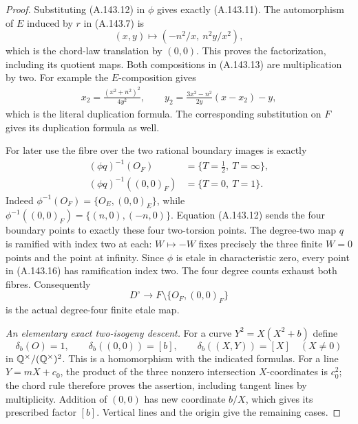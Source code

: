 \begin{proof}
Substituting (A.143.12) in \(\phi\) gives exactly (A.143.11).
The automorphism of \(E\) induced by \(r\) in (A.143.7) is
\[
                         (x,y)\longmapsto
                  (-n^2/x,\ n^2y/x^2),
\tag{A.143.14}
\]
which is the chord-law translation by \((0,0)\).
This proves the factorization, including its quotient maps.
Both compositions in (A.143.13) are multiplication by two.
For example the \(E\)-composition gives
\[
 \begin{gathered}
 x_2=\frac{(x^2+n^2)^2}{4y^2},\qquad
 y_2=\frac{3x^2-n^2}{2y}(x-x_2)-y ,
 \end{gathered}
\tag{A.143.15}
\]
which is the literal duplication formula.
The corresponding substitution on \(F\) gives its duplication
formula as well.

For later use the fibre over the two rational boundary images is
exactly
\[
 \begin{aligned}
 (\phi q)^{-1}(O_F)
      &=\{T=\tfrac12,\ T=\infty\},\\
 (\phi q)^{-1}((0,0)_F)
      &=\{T=0,\ T=1\}.
 \end{aligned}
\tag{A.143.16}
\]
Indeed \(\phi^{-1}(O_F)=\{O_E,(0,0)_E\}\), while
\(\phi^{-1}((0,0)_F)=\{(n,0),(-n,0)\}\).
Equation (A.143.12) sends the four boundary points to exactly
these four two-torsion points.  The degree-two map \(q\) is
ramified with index two at each: \(W\mapsto-W\) fixes precisely
the three finite \(W=0\) points and the point at infinity.
Since \(\phi\) is etale in characteristic zero, every point in
(A.143.16) has ramification index two.
The four degree counts exhaust both fibres.
Consequently
\[
             D^\circ\longrightarrow
                 F\setminus\{O_F,(0,0)_F\}
\tag{A.143.17}
\]
is the actual degree-four finite etale map.

\emph{An elementary exact two-isogeny descent.}
For a curve \(Y^2=X(X^2+b)\) define
\[
 \delta_b(O)=1,\qquad \delta_b((0,0))=[b],\qquad
                    \delta_b((X,Y))=[X]\quad(X\ne0)
\tag{A.143.18}
\]
in \(\mathbb Q^\times/(\mathbb Q^\times)^2\).
This is a homomorphism with the indicated formulas.
For a line \(Y=mX+c_0\), the product of the three nonzero
intersection \(X\)-coordinates is \(c_0^2\); the chord rule
therefore proves the assertion, including tangent lines by
multiplicity.  Addition of \((0,0)\) has new coordinate \(b/X\),
which gives its prescribed factor \([b]\).
Vertical lines and the origin give the remaining cases.


\end{proof}
